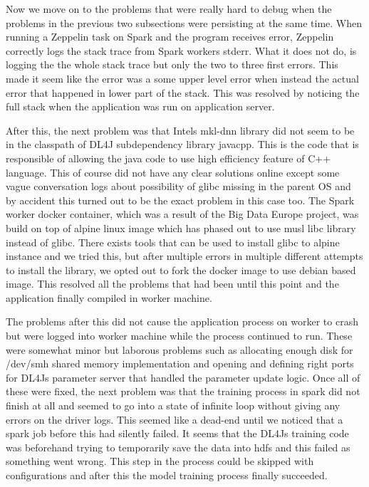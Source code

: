 Now we move on to the problems that were really hard to debug when the problems in the previous two subsections were persisting at the same time.
When running a Zeppelin task on Spark and the program receives error, Zeppelin correctly logs the stack trace from Spark workers stderr.
What it does not do, is logging the the whole stack trace but only the two to three first errors.
This made it seem like the error was a some upper level error when instead the actual error that happened in lower part of the stack.
This was resolved by noticing the full stack when the application was run on application server.

After this, the next problem was that Intels mkl-dnn library did not seem to be in the classpath of DL4J subdependency library javacpp.
This is the code that is responsible of allowing the java code to use high efficiency feature of C++ language.
This of course did not have any clear solutions online except some vague conversation logs about possibility of glibc missing in the parent OS and by accident this turned out to be the exact problem in this case too.
The Spark worker docker container, which was a result of the Big Data Europe project, was build on top of alpine linux image which has phased out to use musl libc library instead of glibc.
There exists tools that can be used to install glibc to alpine instance and we tried this, but after multiple errors in multiple different attempts to install the library, we opted out to fork the docker image to use debian based image.
This resolved all the problems that had been until this point and the application finally compiled in worker machine.

The problems after this did not cause the application process on worker to crash but were logged into worker machine while the process continued to run.
These were somewhat minor but laborous problems such as allocating enough disk for /dev/smh shared memory implementation and opening and defining right ports for DL4Js parameter server that handled the parameter update logic.
Once all of these were fixed, the next problem was that the training process in spark did not finish at all and seemed to go into a state of infinite loop without giving any errors on the driver logs.
This seemed like a dead-end until we noticed that a spark job before this had silently failed.
It seems that the DL4Js training code was beforehand trying to temporarily save the data into hdfs and this failed as something went wrong.
This step in the process could be skipped with configurations and after this the model training process finally succeeded.

